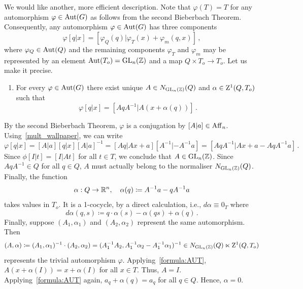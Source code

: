We would like another, more efficient description.
Note that $\varphi (T) =T$ for any automorphism $\varphi \in \operatorname{Aut} (G)$ as follows from the second Bieberbach Theorem.
Consequently, any automorphism $\varphi \in \operatorname{Aut} (G)$ has three components
\begin{equation} \label{formula:AUT0}
  \varphi [q|x] = [ \varphi_Q (q) | \varphi_T (x) + \varphi_m (q,x)] \, , 
\end{equation}
where $\varphi_Q\in \operatorname{Aut} (Q)$ and the remaining components
$\varphi_T$ and $\varphi_m$ may be represented by an element $\operatorname{Aut} (T_o) = \operatorname{GL}_n ({\mathbb Z})$ and a map $Q \times T_o \to T_o$.
Let us make it precise. 
  \begin{enumerate}[resume, label=\textnormal{(\Roman*)}]
  \item For every $\varphi \in \operatorname{Aut} (G)$ there exist unique $A\in N_{\operatorname{GL}_n ({\mathbb Z})}(Q)$ and $\alpha \in \mathrm{Z}^1 (Q,T_o)$
  such that   
\begin{equation} \label{formula:AUT}
  \varphi [q|x] = [ AqA^{-1} | A(x + \alpha (q))] \, .
\end{equation}
  \end{enumerate}
  \begin{just}
    By the second Bieberbach Theorem, $\varphi$ is a conjugation by $[A|a]\in \operatorname{Aff}_n$.  Using~\eqref{mult_wallpaper}, we can write
    \[
    \varphi [q|x] =
            [ A|a] [q|x][A|a]^{-1}  =
            [ Aq | Ax +a][A^{-1}| - A^{-1}a]  =
                       [ AqA^{-1} |Ax +a - AqA^{-1}a] \, .
    \]
    Since $\phi [I|t] = [I|At]$ for all $t\in T$, we conclude that $A\in \operatorname{GL}_n ({\mathbb Z})$.
    Since $AqA^{-1}\in Q$ for all $q\in Q$, $A$ must actually belong to the normaliser $N_{\operatorname{GL}_n ({\mathbb Z})}(Q)$.
    Finally, the function 
    \[ \alpha : Q \to {\mathbb R}^n, \quad \alpha (q) \coloneqq A^{-1}a - qA^{-1}a\]
    takes values in $T_o$. It is a 1-cocycle, by a direct calculation, i.e.,  $d \alpha \equiv 0_T$ where
    \[d \alpha (q,s) \coloneqq q\cdot \alpha (s) - \alpha (qs)+ \alpha (q) \, . \]
    Finally, suppose $(A_1,\alpha_1)$ and $(A_2,\alpha_2)$ represent the same automorphism.
    Then
    \[
    (A,\alpha) \coloneqq (A_1,\alpha_1)^{-1}\cdot(A_2,\alpha_2) = (A_1^{-1}A_2, A_1^{-1}\alpha_2 - A_1^{-1}\alpha_1)^{-1} \in N_{\operatorname{GL}_n ({\mathbb Z})}(Q) \ltimes \mathrm{Z}^1 (Q,T_o)
    \] 
    represents the trivial automorphism $\varphi$. Applying~\eqref{formula:AUT}, $A(x+\alpha(I)) = x+\alpha(I)$ for all $x\in T$.
    Thus, $A=I$.
    Applying~\eqref{formula:AUT} again, $a_q+\alpha(q) =a_q$ for all $q\in Q$. Hence, $\alpha =0$. 
  \end{just}
  
